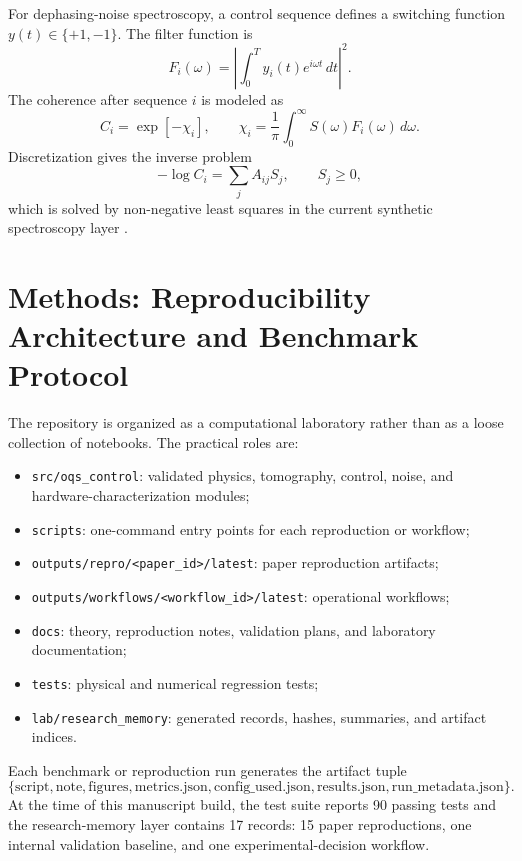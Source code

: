 \documentclass[11pt,a4paper]{article}
\begin{document}
For dephasing-noise spectroscopy, a control sequence defines a switching
function $y(t)\in\{+1,-1\}$.  The filter function is
\begin{equation}
  F_i(\omega)=\left|\int_0^T y_i(t)e^{i\omega t}\,dt\right|^2.
\end{equation}
The coherence after sequence $i$ is modeled as
\begin{equation}
  C_i = \exp[-\chi_i],
  \qquad
  \chi_i = \frac{1}{\pi}\int_0^\infty S(\omega)F_i(\omega)\,d\omega.
\end{equation}
Discretization gives the inverse problem
\begin{equation}
  -\log C_i = \sum_j A_{ij} S_j,
  \qquad S_j\ge 0,
\end{equation}
which is solved by non-negative least squares in the current synthetic
spectroscopy layer \citep{noise_filtering_control_2014,
dd_noise_spectroscopy_2011,flux_qubit_noise_spectroscopy_2011}.

\section{Methods: Reproducibility Architecture and Benchmark Protocol}

The repository is organized as a computational laboratory rather than as a loose
collection of notebooks.  The practical roles are:
\begin{itemize}
  \item \texttt{src/oqs\_control}: validated physics, tomography, control,
  noise, and hardware-characterization modules;
  \item \texttt{scripts}: one-command entry points for each reproduction or
  workflow;
  \item \texttt{outputs/repro/<paper\_id>/latest}: paper reproduction artifacts;
  \item \texttt{outputs/workflows/<workflow\_id>/latest}: operational workflows;
  \item \texttt{docs}: theory, reproduction notes, validation plans, and
  laboratory documentation;
  \item \texttt{tests}: physical and numerical regression tests;
  \item \texttt{lab/research\_memory}: generated records, hashes, summaries,
  and artifact indices.
\end{itemize}

Each benchmark or reproduction run generates the artifact tuple
\begin{equation}
  \{\mathrm{script},\mathrm{note},\mathrm{figures},
  \mathrm{metrics.json},\mathrm{config\_used.json},\mathrm{results.json},
  \mathrm{run\_metadata.json}\}.
\end{equation}
At the time of this manuscript build, the test suite reports 90 passing tests and the
research-memory layer contains 17 records: 15 paper reproductions, one internal
validation baseline, and one experimental-decision workflow.
\end{document}
